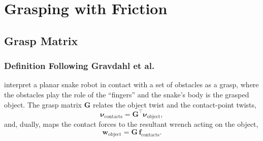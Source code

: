 
\section{Grasping with Friction}
\label{sec:grasping}

\subsection{Grasp Matrix}
\label{sec:grasp-matrix}

\subsubsection{Definition Following Gravdahl et al.}
\label{sec:grasp-matrix-gravdahl}

\textcite{gravdahl2026formclosure} interpret a planar snake robot in contact
with a set of obstacles as a grasp, where the obstacles play the role of the
``fingers'' and the snake's body is the grasped object. The grasp matrix
$\boldsymbol{G}$ relates the object twist and the contact-point twists,
\begin{equation}
    \boldsymbol{\nu}_{\text{contacts}} = \boldsymbol{G}^\top \boldsymbol{\nu}_{\text{object}} ,
    \label{eq:grasp-matrix-velocity}
\end{equation}
and, dually, maps the contact forces to the resultant wrench acting on the
object,
\begin{equation}
    \boldsymbol{w}_{\text{object}} = \boldsymbol{G}\, \boldsymbol{f}_{\text{contacts}} .
    \label{eq:grasp-matrix-wrench}
\end{equation}

